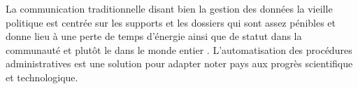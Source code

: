 \documentclass{article}
\begin{document}
La communication traditionnelle disant bien la gestion des données la vieille politique est centrée sur les supports et les dossiers qui sont assez pénibles et donne lieu à une perte de temps d'énergie ainsi que de statut dans la communauté et plutôt le dans le monde entier . L'automatisation des procédures administratives est une solution pour adapter noter pays  aux  progrès scientifique et  technologique.
\end{document}
